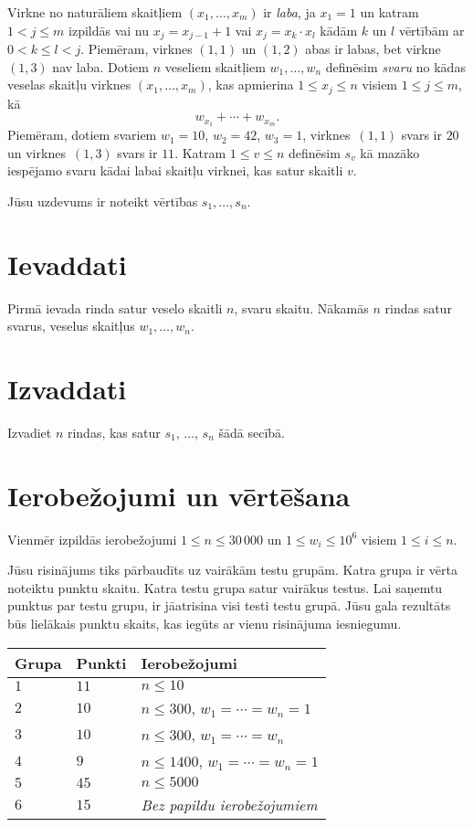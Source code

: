 
\noindent
Virkne no naturāliem skaitļiem $(x_1, \ldots, x_m)$ ir \emph{laba}, ja $x_1 = 1$ un katram $1 < j \leq m$ izpildās vai nu $x_j = x_{j-1}+1$ vai $x_j = x_k \cdot x_l$ kādām $k$ un $l$ vērtībām ar $0 < k \leq l < j$. 
Piemēram, virknes $(1,1)$ un $(1,2)$ abas ir labas, bet virkne $(1,3)$ nav laba.
Dotiem $n$ veseliem skaitļiem $w_1, \ldots, w_n$ definēsim \emph{svaru} no kādas veselas skaitļu virknes $(x_1, \ldots, x_m)$, kas apmierina $1 \leq x_j \leq n$ visiem $1 \leq j \leq m$, kā
\[ w_{x_1} + \cdots + w_{x_m}. \]
Piemēram, dotiem svariem $w_1 = 10$, $w_2 = 42$, $w_3 = 1$, virknes~$(1,1)$ svars ir $20$ un virknes~$(1,3)$ svars ir $11$. 
Katram $1\leq v\leq n$ definēsim $s_v$ kā mazāko iespējamo svaru kādai labai skaitļu virknei, kas satur skaitli $v$.

Jūsu uzdevums ir noteikt vērtības $s_1,\ldots ,s_n$.

\section*{Ievaddati}

Pirmā ievada rinda satur veselo skaitli $n$, svaru skaitu.
Nākamās $n$ rindas satur svarus, veselus skaitļus $w_1, \ldots, w_n$.

\section*{Izvaddati}

Izvadiet $n$ rindas, kas satur $s_1$, $\ldots$, $s_n$ šādā secībā.

\section*{Ierobežojumi un vērtēšana}

Vienmēr izpildās ierobežojumi
$1\leq n \leq 30\,000$ %
un
$1\leq w_i \leq 10^6$ visiem $1\leq i \leq n$.%

Jūsu risinājums tiks pārbaudīts uz vairākām testu grupām. Katra grupa ir vērta noteiktu punktu skaitu.
Katra testu grupa satur vairākus testus.
Lai saņemtu punktus par testu grupu, ir jāatrisina visi testi testu grupā.
Jūsu gala rezultāts būs lielākais punktu skaits, kas iegūts ar vienu risinājuma iesniegumu.

\medskip
\begin{tabular}{lll}
Grupa & Punkti & Ierobežojumi \\\hline
$1$   & $11$ & $n\leq 10$ \\
$2$   & $10$ & $n\leq 300$, $w_1=\cdots=w_n = 1$ \\
$3$   & $10$ & $n\leq 300$, $w_1=\cdots=w_n$ \\ %
$4$   & $9$ & $n\leq 1400$, $w_1=\cdots=w_n = 1$ \\
$5$   & $45$ & $n\leq 5000$\\
$6$   & $15$ & \emph{Bez papildu ierobežojumiem}
\end{tabular}
